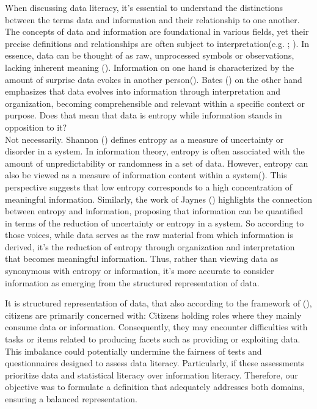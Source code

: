 \documentclass[
  12pt,
  a4paper,
  twoside]{article}
\begin{document}
When discussing data literacy, it's essential to understand the distinctions between the terms data and information and their relationship to one another.
The concepts of data and information are foundational in various fields, yet their precise definitions and relationships are often subject to interpretation(e.g. ; ). In essence, data can be thought of as raw, unprocessed symbols or observations, lacking inherent meaning (). Information on one hand is characterized by the amount of surprise data evokes in another person(). Bates () on the other hand emphasizes that data evolves into information through interpretation and organization, becoming comprehensible and relevant within a specific context or purpose. Does that mean that data is entropy while information stands in opposition to it?\\
Not necessarily. Shannon () defines entropy as a measure of uncertainty or disorder in a system. In information theory, entropy is often associated with the amount of unpredictability or randomness in a set of data. However, entropy can also be viewed as a measure of information content within a system(). This perspective suggests that low entropy corresponds to a high concentration of meaningful information. Similarly, the work of Jaynes () highlights the connection between entropy and information, proposing that information can be quantified in terms of the reduction of uncertainty or entropy in a system.
So according to those voices, while data serves as the raw material from which information is derived, it's the reduction of entropy through organization and interpretation that becomes meaningful information. Thus, rather than viewing data as synonymous with entropy or information, it's more accurate to consider information as emerging from the structured representation of data.

It is structured representation of data, that also according to the framework of (), citizens are primarily concerned with: Citizens holding roles where they mainly consume data or information. Consequently, they may encounter difficulties with tasks or items related to producing facets such as providing or exploiting data. This imbalance could potentially undermine the fairness of tests and questionnaires designed to assess data literacy. Particularly, if these assessments prioritize data and statistical literacy over information literacy. Therefore, our objective was to formulate a definition that adequately addresses both domains, ensuring a balanced representation.
\end{document}
